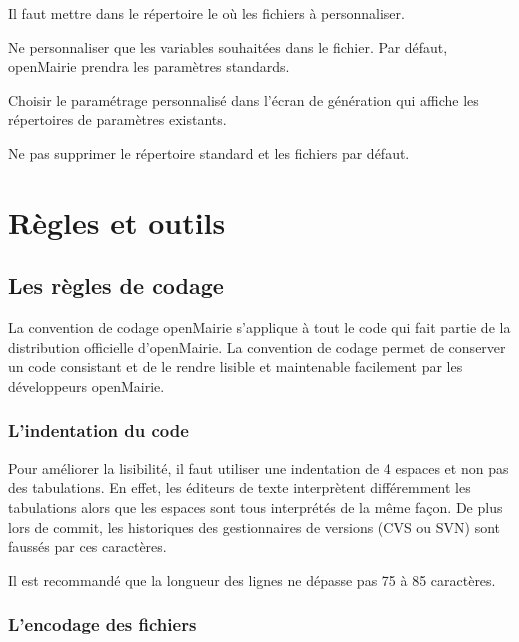 \documentclass[letterpaper,10pt,french]{manual}
\begin{document}
Il faut mettre dans le répertoire le où les fichiers à personnaliser.

Ne personnaliser que les variables souhaitées dans le fichier. Par défaut, openMairie prendra les paramètres standards.

Choisir le paramétrage personnalisé dans l'écran de génération qui affiche les répertoires de paramètres existants.

Ne pas supprimer le répertoire  standard et les fichiers par défaut.


\chapter{Règles et outils}

\resetcurrentobjects
\hypertarget{--doc-regles/index}{}

\hypertarget{regles}{}\section{Les règles de codage}

La convention de codage openMairie s'applique à tout le code qui fait partie
de la distribution officielle d'openMairie. La convention de codage permet de
conserver un code consistant et de le rendre lisible et maintenable facilement
par les développeurs openMairie.

\resetcurrentobjects
\hypertarget{--doc-regles/indentation}{}

\hypertarget{indentation}{}\subsection{L'indentation du code}

Pour améliorer la lisibilité, il faut utiliser une indentation de 4 espaces et
non pas des tabulations. En effet, les éditeurs de texte interprètent
différemment les tabulations alors que les espaces sont tous interprétés de la
même façon. De plus lors de commit, les historiques des gestionnaires de
versions (CVS ou SVN) sont faussés par ces caractères.

Il est recommandé que la longueur des lignes ne dépasse pas 75 à 85 caractères.

\resetcurrentobjects
\hypertarget{--doc-regles/encodage}{}

\hypertarget{encodage}{}\subsection{L'encodage des fichiers}
\end{document}
